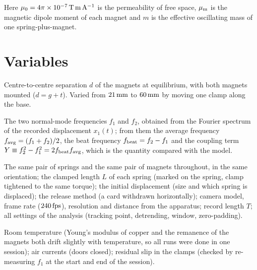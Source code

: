 Here $\mu_0=4\pi\times10^{-7}\,\mathrm{T\,m\,A^{-1}}$ is the permeability of free space, $\mu_{\mathrm m}$ is the magnetic dipole moment of each magnet and $m$ is the effective oscillating mass of one spring-plus-magnet.

\section{Variables}

\begin{description}[leftmargin=3.2cm,style=sameline]
\item[Independent] Centre-to-centre separation $d$ of the magnets at equilibrium, with both magnets mounted ($d=g+t$). Varied from $21\,\mathrm{mm}$ to $60\,\mathrm{mm}$ by moving one clamp along the base.
\item[Dependent] The two normal-mode frequencies $f_1$ and $f_2$, obtained from the Fourier spectrum of the recorded displacement $x_1(t)$; from them the average frequency $f_{\rm avg}=(f_1+f_2)/2$, the beat frequency $f_{\rm beat}=f_2-f_1$ and the coupling term $Y\equiv f_2^2-f_1^2=2f_{\rm beat}f_{\rm avg}$, which is the quantity compared with the model.
\item[Controlled] The same pair of springs and the same pair of magnets throughout, in the same orientation; the clamped length $L$ of each spring (marked on the spring, clamp tightened to the same torque); the initial displacement (size and which spring is displaced); the release method (a card withdrawn horizontally); camera model, frame rate ($240\,\mathrm{fps}$), resolution and distance from the apparatus; record length $T$; all settings of the analysis (tracking point, detrending, window, zero-padding).
\item[Uncontrolled / monitored] Room temperature (Young's modulus of copper and the remanence of the magnets both drift slightly with temperature, so all runs were done in one session); air currents (doors closed); residual slip in the clamps (checked by re-measuring $f_1$ at the start and end of the session).
\end{description}
